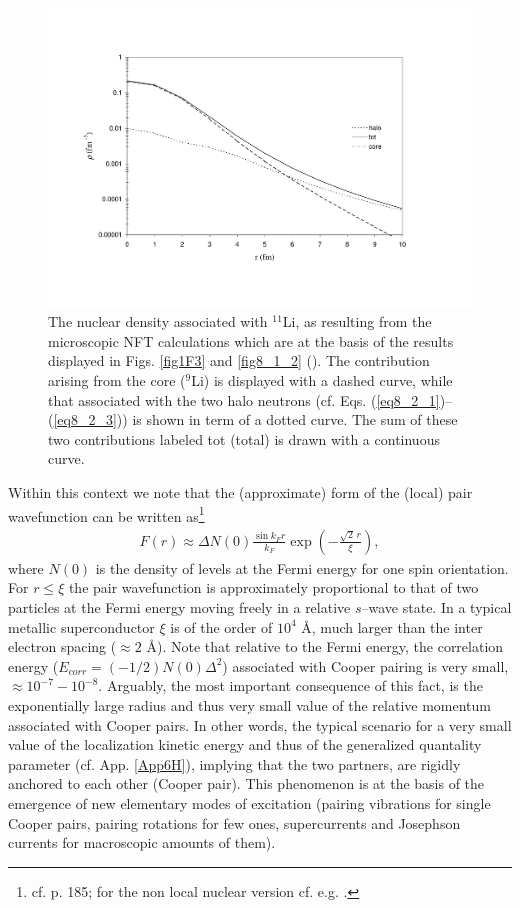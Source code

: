 \begin{figure}
\centerline{\includegraphics*[width=15cm,angle=0]{nutshell/figs/fig3_2_2.pdf}}
\caption{The nuclear density associated with $^{11}$Li, as resulting from the microscopic NFT calculations which are at the basis of the results displayed in Figs. \ref{fig1F3} and \ref{fig8_1_2} (\cite{Barranco:01}). The contribution arising from the core ($^{9}$Li) is displayed with a dashed curve, while that associated with the two halo neutrons (cf. Eqs. (\ref{eq8_2_1})--(\ref{eq8_2_3})) is shown in term of a dotted curve. The sum of these two contributions  labeled tot (total) is drawn with a continuous curve.}\label{fig3.2.2}
\end{figure}
Within this context we note that the (approximate) form of the (local) pair wavefunction can be written as\footnote{cf. \cite{Leggett:06} p. 185; for the non local nuclear version cf. e.g. \cite{Broglia:83c}.}
\begin{align}
F(r)\approx\Delta N(0)\frac{\sin k_F r}{k_F}\exp\left(-\frac{\sqrt{2}\,r}{\xi}\right),
\end{align}
where $N(0)$ is the density of levels at the Fermi energy for one spin orientation. For $r\leq\xi$ the pair wavefunction is approximately proportional to that of two particles at the Fermi energy moving freely in a relative $s$--wave state. In a typical metallic superconductor $\xi$ is of the order of $10^4$ \AA, much larger than the inter electron spacing ($\approx 2$ \AA). Note that relative to the Fermi energy, the correlation energy ($E_{corr}=(-1/2)N(0)\Delta^2$) associated with Cooper pairing is very small, $\approx 10^{-7}-10^{-8}$. Arguably, the most important consequence of this fact, is the exponentially large radius and thus very small value of the relative momentum associated with Cooper pairs. In other words, the typical scenario for a very small value of the localization kinetic energy and thus of the generalized quantality parameter (cf. App. \ref{App6H}), implying that the two partners, are rigidly anchored to each other (Cooper pair). This phenomenon is at the basis  of the emergence of new elementary modes of excitation (pairing vibrations for single Cooper pairs, pairing rotations for few ones, supercurrents and Josephson currents for macroscopic amounts of them).

